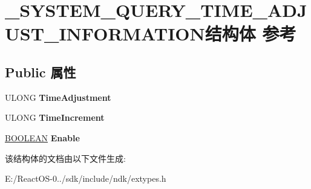 \hypertarget{struct___s_y_s_t_e_m___q_u_e_r_y___t_i_m_e___a_d_j_u_s_t___i_n_f_o_r_m_a_t_i_o_n}{}\section{\+\_\+\+S\+Y\+S\+T\+E\+M\+\_\+\+Q\+U\+E\+R\+Y\+\_\+\+T\+I\+M\+E\+\_\+\+A\+D\+J\+U\+S\+T\+\_\+\+I\+N\+F\+O\+R\+M\+A\+T\+I\+O\+N结构体 参考}
\label{struct___s_y_s_t_e_m___q_u_e_r_y___t_i_m_e___a_d_j_u_s_t___i_n_f_o_r_m_a_t_i_o_n}
\subsection*{Public 属性}
\begin{DoxyCompactItemize}
\item 
\mbox{\label{struct___s_y_s_t_e_m___q_u_e_r_y___t_i_m_e___a_d_j_u_s_t___i_n_f_o_r_m_a_t_i_o_n_a4ee0a1f0780d16fc489954743f30e900}} 
U\+L\+O\+NG {\bfseries Time\+Adjustment}
\item 
\mbox{\label{struct___s_y_s_t_e_m___q_u_e_r_y___t_i_m_e___a_d_j_u_s_t___i_n_f_o_r_m_a_t_i_o_n_abf9b52e946bbb75a574ef06fd763a48a}} 
U\+L\+O\+NG {\bfseries Time\+Increment}
\item 
\mbox{\label{struct___s_y_s_t_e_m___q_u_e_r_y___t_i_m_e___a_d_j_u_s_t___i_n_f_o_r_m_a_t_i_o_n_a47ae0e17cba3d5f1d1b0b55d6d32f816}} 
\hyperlink{_processor_bind_8h_a112e3146cb38b6ee95e64d85842e380a}{B\+O\+O\+L\+E\+AN} {\bfseries Enable}
\end{DoxyCompactItemize}


该结构体的文档由以下文件生成\+:\begin{DoxyCompactItemize}
\item 
E\+:/\+React\+O\+S-\/0../sdk/include/ndk/extypes.\+h\end{DoxyCompactItemize}

